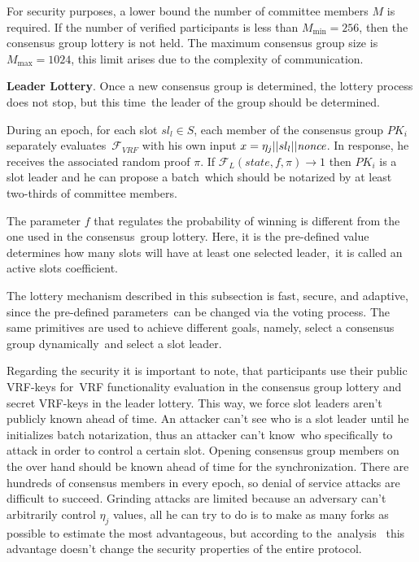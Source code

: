 For security purposes, a lower bound the number of committee members $M$ is required.
If the number of verified participants is less than ${M_{\min}=256}$, then the consensus group lottery is not held.
The maximum consensus group size is ${M_{\max}=1024}$, this limit arises due to the complexity of communication.

\textbf{Leader Lottery}.
Once a new consensus group is determined, the lottery process does not stop, but this time\
the leader of the group should be determined.

During an epoch, for each slot ${sl_l \in S}$, each member of the consensus group $PK_i$ separately evaluates\
${\mathcal{F}}_{VRF}$ with his own input ${x = \eta_j || sl_l || \emph{nonce}}$.
In response, he receives the associated random proof $\pi$.
If ${\mathcal{F}}_{L}(state, f, \pi) \rightarrow 1$ then $PK_i$ is a slot leader and he can propose a batch\
which should be notarized by at least two-thirds of committee members.

The parameter $f$ that regulates the probability of winning is different from the one used in the consensus\
group lottery.
Here, it is the pre-defined value determines how many slots will have at least one selected leader,\
it is called an active slots coefficient.

The lottery mechanism described in this subsection is fast, secure, and adaptive, since the pre-defined parameters\
can be changed via the voting process.
The same primitives are used to achieve different goals, namely, select a consensus group dynamically\
and select a slot leader.

Regarding the security it is important to note, that participants use their public VRF-keys for\
VRF functionality evaluation in the consensus group lottery and secret VRF-keys in the leader lottery.
This way, we force slot leaders aren't publicly known ahead of time.
An attacker can't see who is a slot leader until he initializes batch notarization, thus an attacker can't know\
who specifically to attack in order to control a certain slot.
Opening consensus group members on the over hand should be known ahead of time for the synchronization.
There are hundreds of consensus members in every epoch, so denial of service attacks are difficult to succeed.
Grinding attacks are limited because an adversary can't arbitrarily control $\eta_j$ values,
all he can try to do is to make as many forks as possible to estimate the most advantageous, but according to the\
analysis~\cite{cryptoeprint:2017/573} this advantage doesn't change the security properties of the entire protocol.


